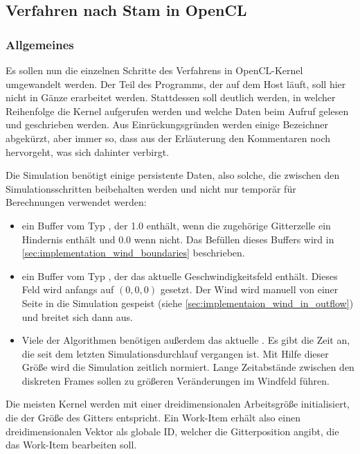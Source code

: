 \subsection{Verfahren nach Stam in OpenCL}

\subsubsection{Allgemeines}
\label{sec:implementation_wind_stam_general}

Es sollen nun die einzelnen Schritte des Verfahrens in OpenCL-Kernel
umgewandelt werden. Der Teil des Programms, der auf dem Host läuft,
soll hier nicht in Gänze erarbeitet werden. Stattdessen soll deutlich
werden, in welcher Reihenfolge die Kernel aufgerufen werden und welche
Daten beim Aufruf gelesen und geschrieben werden. Aus
Einrückungsgründen werden einige Bezeichner abgekürzt, aber immer so,
dass aus der Erläuterung \Pimiddybzw{} den Kommentaren noch hervorgeht, was
sich dahinter verbirgt.

Die Simulation benötigt einige persistente Daten, also solche, die
zwischen den Simulationsschritten beibehalten werden und nicht nur
temporär für Berechnungen verwendet werden:

\begin{itemize}
\item ein Buffer  vom Typ
, der 1.0 enthält, wenn die zugehörige
Gitterzelle ein Hindernis enthält und 0.0 wenn nicht. Das Befüllen
dieses Buffers wird in
\cref{sec:implementation_wind_boundaries} beschrieben.
\item ein Buffer  vom Typ
, der das aktuelle Geschwindigkeitsfeld enthält.
Dieses Feld wird anfangs auf $(0,0,0)$ gesetzt. Der Wind wird manuell von
einer Seite in die Simulation gespeist (siehe
\cref{sec:implementaion_wind_in_outflow}) und breitet sich dann
aus.
\item Viele der Algorithmen benötigen außerdem das aktuelle
 . Es gibt die
Zeit an, die seit dem letzten Simulationsdurchlauf vergangen ist. Mit
Hilfe dieser Größe wird die Simulation zeitlich normiert. Lange
Zeitabstände zwischen den diskreten Frames sollen zu größeren
Veränderungen im Windfeld führen.
\end{itemize}

Die meisten Kernel werden mit einer dreidimensionalen Arbeitsgröße
initialisiert, die der Größe des Gitters entspricht. Ein Work-Item
erhält also einen dreidimensionalen Vektor als globale ID, welcher die
Gitterposition angibt, die das Work-Item bearbeiten soll.

